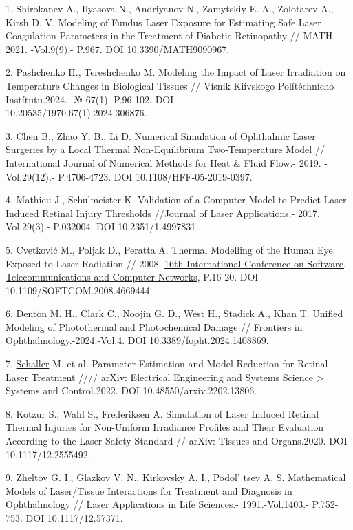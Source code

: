 \begin{references}
1. Shirokanev A., Ilyasova N., Andriyanov N., Zamytskiy E. A., Zolotarev
A., Kirsh D. V. Modeling of Fundus Laser Exposure for Estimating Safe
Laser Coagulation Parameters in the Treatment of Diabetic Retinopathy //
MATH.- 2021. -Vol.9(9).- P.967. DOI 10.3390/MATH9090967.

2. Pashchenko H., Tereshchenko M. Modeling the Impact of Laser
Irradiation on Temperature Changes in Biological Tissues // Vísnik
Kiívskogo Polítéchnícho Instítutu.2024. -№ 67(1).-P.96-102. DOI\\
10.20535/1970.67(1).2024.306876.

3. Chen B., Zhao Y. B., Li D. Numerical Simulation of Ophthalmic Laser
Surgeries by a Local Thermal Non-Equilibrium Two-Temperature Model //
International Journal of Numerical Methods for Heat \& Fluid Flow.-
2019. - Vol.29(12).- P.4706-4723. DOI 10.1108/HFF-05-2019-0397.

4. Mathieu J., Schulmeister K. Validation of a Computer Model to Predict
Laser Induced Retinal Injury Thresholds //Journal of Laser
Applications.- 2017. Vol.29(3).- P.032004. DOI 10.2351/1.4997831.

5. Cvetković M., Poljak D., Peratta A. Thermal Modelling of the Human Eye
Exposed to Laser Radiation // 2008.
\href{https://ieeexplore.ieee.org/xpl/conhome/4662489/proceeding}{16th
International Conference on Software, Telecommunications and Computer
Networks}, P.16-20. DOI 10.1109/SOFTCOM.2008.4669444.

6. Denton M. H., Clark C., Noojin G. D., West H., Stadick A., Khan T.
Unified Modeling of Photothermal and Photochemical Damage // Frontiers
in Ophthalmology.-2024.-Vol.4. DOI 10.3389/fopht.2024.1408869.

7. \href{https://www.researchgate.net/profile/Manuel-Schaller-2?_tp=eyJjb250ZXh0Ijp7ImZpcnN0UGFnZSI6InB1YmxpY2F0aW9uIiwicGFnZSI6InB1YmxpY2F0aW9uIn19}{Schaller}
M. et al. Parameter Estimation and Model Reduction for Retinal Laser
Treatment //// arXiv: Electrical Engineering and Systems Science
\textgreater{} Systems and Control.2022. DOI 10.48550/arxiv.2202.13806.

8. Kotzur S., Wahl S., Frederiksen A. Simulation of Laser Induced Retinal
Thermal Injuries for Non-Uniform Irradiance Profiles and Their
Evaluation According to the Laser Safety Standard // arXiv: Tissues and
Organs.2020. DOI 10.1117/12.2555492.

9. Zheltov G. I., Glazkov V. N., Kirkovsky A. I.,
Podol' tsev A. S. Mathematical Models of Laser/Tissue
Interactions for Treatment and Diagnosis in Ophthalmology // Laser
Applications in Life Sciences.- 1991.-Vol.1403.- P.752-753. DOI
10.1117/12.57371.


\end{references}
